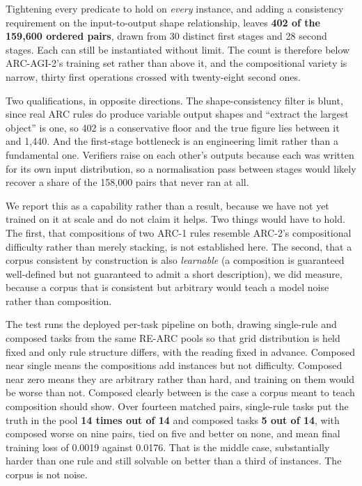 \documentclass[11pt]{article}
\begin{document}
Tightening every predicate to hold on \emph{every} instance, and adding a consistency requirement on
the input-to-output shape relationship, leaves \textbf{402 of the 159{,}600 ordered pairs}, drawn
from 30 distinct first stages and 28 second stages. Each can still be instantiated without limit.
The count is therefore below ARC-AGI-2's training set rather than above it, and the compositional
variety is narrow, thirty first operations crossed with twenty-eight second ones.

Two qualifications, in opposite directions. The shape-consistency filter is blunt, since real ARC
rules do produce variable output shapes and ``extract the largest object'' is one, so 402 is a
conservative floor and the true figure lies between it and 1{,}440. And the first-stage bottleneck is
an engineering limit rather than a fundamental one. Verifiers raise on each other's outputs because
each was written for its own input distribution, so a normalisation pass between stages would likely
recover a share of the 158{,}000 pairs that never ran at all.

We report this as a capability rather than a result, because we have not yet trained on it at scale
and do not claim it helps. Two things would have to hold. The first, that compositions of two ARC-1
rules resemble ARC-2's compositional difficulty rather than merely stacking, is not established here.
The second, that a corpus consistent by construction is also \emph{learnable} (a composition is
guaranteed well-defined but not guaranteed to admit a short description), we did measure, because a
corpus that is consistent but arbitrary would teach a model noise rather than composition.

The test runs the deployed per-task pipeline on both, drawing single-rule and composed tasks from the
same RE-ARC pools so that grid distribution is held fixed and only rule structure differs, with the
reading fixed in advance. Composed near single means the compositions add instances but not
difficulty. Composed near zero means they are arbitrary rather than hard, and training on them would
be worse than not. Composed clearly between is the case a corpus meant to teach composition should
show. Over fourteen matched pairs, single-rule tasks put the truth in the pool \textbf{14 times out
of 14} and composed tasks \textbf{5 out of 14}, with composed worse on nine pairs, tied on five and
better on none, and mean final training loss of 0.0019 against 0.0176. That is the middle case,
substantially harder than one rule and still solvable on better than a third of instances. The corpus
is not noise.
\end{document}
